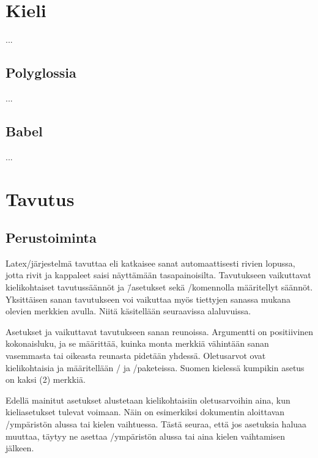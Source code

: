 
\section{Kieli}
\label{luku:kieliasetukset}

...

\subsection{Polyglossia}

...

\subsection{Babel}

...

\section{Tavutus}
\label{luku:tavutus}

\subsection{Perustoiminta}

Latex\-/järjestelmä tavuttaa eli katkaisee sanat automaattisesti rivien
lopussa, jotta rivit ja kappaleet saisi näyttämään tasapainoisilta.
Tavutukseen vaikuttavat kielikohtaiset tavutussäännöt ja \=/asetukset
sekä \-/komennolla määritellyt säännöt.
Yksittäisen sanan tavutukseen voi vaikuttaa myös tiettyjen sanassa
mukana olevien merkkien avulla. Niitä käsitellään seuraavissa
alaluvuissa.

Asetukset  ja  vaikuttavat tavutukseen sanan reunoissa.
Argumentti  on positiivinen kokonaisluku, ja se määrittää,
kuinka monta merkkiä vähintään sanan vasemmasta tai oikeasta reunasta
pidetään yhdessä. Oletus\-arvot ovat kielikohtaisia ja määritellään
\-/{} ja \-/paketeissa. Suomen
kielessä kumpikin asetus on kaksi (2) merkkiä.

Edellä mainitut asetukset alustetaan kielikohtaisiin oletus\-arvoihin
aina, kun kie\-li\-ase\-tuk\-set tulevat voimaan. Näin on esimerkiksi
dokumentin aloittavan \-/ympäristön alussa tai kielen
vaihtuessa. Tästä seuraa, että jos asetuksia ha\-luaa muuttaa, täytyy ne
asettaa \-/ympäristön alussa tai aina kielen vaihtamisen
jälkeen.


